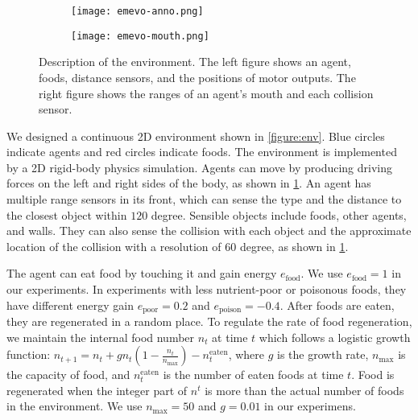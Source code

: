 \begin{figure}[t]
  \begin{subfigure}[t]{4cm}
    \centering
    \texttt{[image: emevo-anno.png]}
  \end{subfigure}
  \begin{subfigure}[t]{4cm}
    \centering
    \texttt{[image: emevo-mouth.png]}
  \end{subfigure}
  \caption{
    Description of the environment.
    The left figure shows an agent, foods, distance sensors, and the positions of motor outputs.
    The right figure shows the ranges of an agent's mouth and each collision sensor.
  }\label{figure:env-discr}
\end{figure}

We designed a continuous 2D environment shown in \cref{figure:env}. Blue circles indicate agents and red circles indicate foods. The environment is implemented by a 2D rigid-body physics simulation. Agents can move by producing driving forces on the left and right sides of the body, as shown in \cref{figure:env-discr}. An agent has multiple range sensors in its front, which can sense the type and the distance to the closest object within $120$ degree. Sensible objects include foods, other agents, and walls. They can also sense the collision with each object and the approximate location of the collision with a resolution of $60$ degree, as shown in \cref{figure:env-discr}.

The agent can eat food by touching it and gain energy $e_{\mathrm{food}}$. We use $e_{\mathrm{food}} = 1$ in our experiments. In experiments with less nutrient-poor or poisonous foods, they have different energy gain $e_{\mathrm{poor}} = 0.2$ and $e_{\mathrm{poison}} = -0.4$. After foods are eaten, they are regenerated in a random place. To regulate the rate of food regeneration, we maintain the internal food number $n_{t}$ at time $t$ which follows a logistic growth function: $n_{t + 1} = n_{t} + gn_{t}(1 - \frac{n_{t}}{n_{\mathrm{max}}}) - n_{t}^{\mathrm{eaten}}$, where $g$ is the growth rate, $n_{\mathrm{max}}$ is the capacity of food, and $n_{t}^{\mathrm{eaten}}$ is the number of eaten foods at time $t$. Food is regenerated when the integer part of $n^{t}$ is more than the actual number of foods in the environment. We use $n_{\mathrm{max}} = 50$ and $g = 0.01$ in our experimens.

